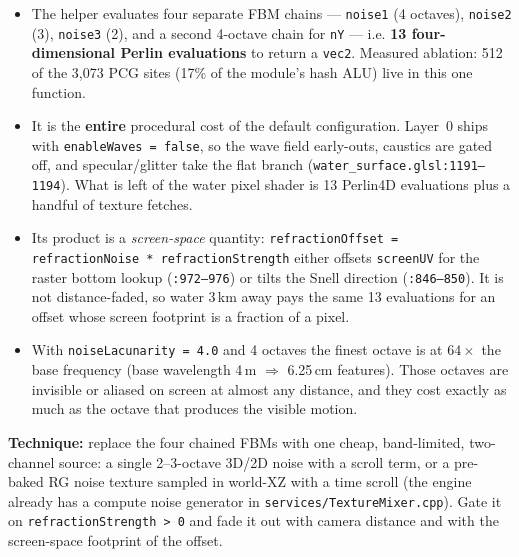 \documentclass[11pt,a4paper]{article}
\begin{document}
\begin{itemize}
    \item The helper evaluates four separate FBM chains --- \texttt{noise1} (4 octaves), \texttt{noise2} (3),
    \texttt{noise3} (2), and a second 4-octave chain for \texttt{nY} --- i.e. \textbf{13 four-dimensional Perlin
    evaluations} to return a \texttt{vec2}. Measured ablation: 512 of the 3,073 PCG sites (17\% of the module's hash
    ALU) live in this one function.
    \item It is the \textbf{entire} procedural cost of the default configuration. Layer~0 ships with
    \texttt{enableWaves = false}, so the wave field early-outs, caustics are gated off, and specular/glitter take the
    flat branch (\texttt{water\_surface.glsl:1191--1194}). What is left of the water pixel shader is 13 Perlin4D
    evaluations plus a handful of texture fetches.
    \item Its product is a \emph{screen-space} quantity: \texttt{refractionOffset = refractionNoise *
    refractionStrength} either offsets \texttt{screenUV} for the raster bottom lookup (\texttt{:972--976}) or tilts the
    Snell direction (\texttt{:846--850}). It is not distance-faded, so water 3\,km away pays the same 13 evaluations for
    an offset whose screen footprint is a fraction of a pixel.
    \item With \texttt{noiseLacunarity = 4.0} and 4 octaves the finest octave is at $64\times$ the base frequency
    (base wavelength 4\,m $\Rightarrow$ 6.25\,cm features). Those octaves are invisible or aliased on screen at almost
    any distance, and they cost exactly as much as the octave that produces the visible motion.
\end{itemize}

\textbf{Technique:} replace the four chained FBMs with one cheap, band-limited, two-channel source: a single
2--3-octave 3D/2D noise with a scroll term, or a pre-baked RG noise texture sampled in world-XZ with a time scroll (the
engine already has a compute noise generator in \texttt{services/TextureMixer.cpp}). Gate it on
\texttt{refractionStrength > 0} and fade it out with camera distance and with the screen-space footprint of the offset.
\end{document}
